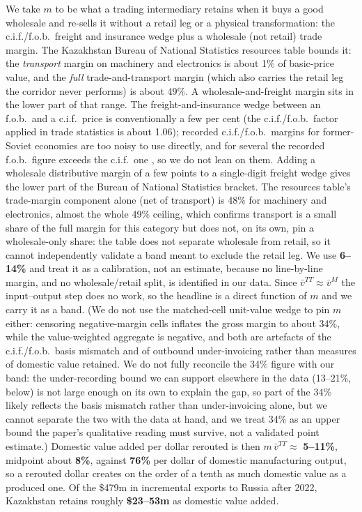 \documentclass[12pt]{article}
\begin{document}
We take $m$ to be what a trading intermediary retains when it buys a good wholesale and
re-sells it without a retail leg or a physical transformation: the c.i.f./f.o.b.\ freight and
insurance wedge plus a wholesale (not retail) trade margin. The Kazakhstan Bureau of National
Statistics resources table \citep{qazstat2023io} bounds it: the \emph{transport} margin on
machinery and electronics is about 1\% of basic-price value, and the \emph{full}
trade-and-transport margin (which also carries the retail leg the corridor never performs) is
about 49\%. A wholesale-and-freight margin sits in the lower part of that range. The
freight-and-insurance wedge between an f.o.b.\ and a c.i.f.\ price is conventionally a few per
cent (the c.i.f./f.o.b.\ factor applied in trade statistics is about 1.06); recorded
c.i.f./f.o.b.\ margins for former-Soviet economies are too noisy to use directly, and for
several the recorded f.o.b.\ figure exceeds the c.i.f.\ one \citep{arvis2010landlocked}, so we
do not lean on them. Adding a wholesale distributive margin of a few points to a single-digit
freight wedge gives the lower part of the Bureau of National Statistics bracket. The resources
table's trade-margin component alone (net of transport) is 48\% for machinery and electronics,
almost the whole 49\% ceiling, which confirms transport is a small share of the full margin for
this category but does not, on its own, pin a wholesale-only share: the table does not separate
wholesale from retail, so it cannot independently validate a band meant to exclude the retail
leg. We use \textbf{6--14\%} and treat it as a calibration, not an estimate, because no
line-by-line margin, and no wholesale/retail split, is identified in our data. Since
$\bar v^{TT} \approx \bar v^{M}$ the input--output
step does no work, so the headline is a direct function of $m$ and we carry it as a band. (We
do not use the matched-cell unit-value wedge to pin $m$ either: censoring negative-margin cells
inflates the gross margin to about 34\%,
while the value-weighted aggregate is negative, and both are artefacts of the c.i.f./f.o.b.\
basis mismatch and of outbound under-invoicing rather than measures of domestic value
retained. We do not fully reconcile the 34\% figure with our band: the under-recording bound we
can support elsewhere in the data (13--21\%, below) is not large enough on its own to explain
the gap, so part of the 34\% likely reflects the basis mismatch rather than under-invoicing
alone, but we cannot separate the two with the data at hand, and we treat 34\% as an upper
bound the paper's qualitative reading must survive, not a validated point estimate.)
Domestic value added per dollar rerouted is then $m\,\bar v^{TT} \approx$ \textbf{5--11\%},
midpoint about \textbf{8\%}, against \textbf{76\%} per dollar of domestic manufacturing
output, so a rerouted dollar creates on the order of a tenth as much domestic value as a
produced one. Of the \$479m in incremental exports to Russia after 2022, Kazakhstan retains
roughly \textbf{\$23--53m} as domestic value added.
\end{document}

